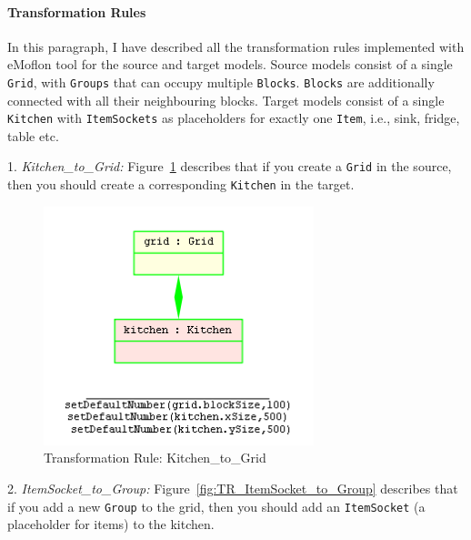 

\paragraph{Transformation Rules} In this paragraph, I have described all the transformation rules implemented with eMoflon tool for the source and target models. Source models consist of a single \texttt{Grid}, with \texttt{Groups} that can occupy multiple \texttt{Blocks}. \texttt{Blocks} are additionally connected with all their neighbouring blocks. Target models consist of a single \texttt{Kitchen} with \texttt{ItemSockets} as placeholders for exactly one \texttt{Item}, i.e., sink, fridge, table etc.

1. \textit{Kitchen\_to\_Grid: }  Figure~\ref{fig:TR_Kitchen_to_Grid} describes that if you create a \texttt{Grid} in the source, then you should create a corresponding \texttt{Kitchen} in the target.

\begin{figure}[h]
	\centering
	\includegraphics[width=0.7\textwidth]{figures/TR_Kitchen_to_Grid}
	\caption{Transformation Rule: Kitchen\_to\_Grid}
	\label{fig:TR_Kitchen_to_Grid}
\end{figure}

2. \textit{ItemSocket\_to\_Group: } Figure~\ref{fig:TR_ItemSocket_to_Group} describes that if you add a new \texttt{Group} to the grid, then you should add an \texttt{ItemSocket} (a placeholder for items) to the kitchen.

